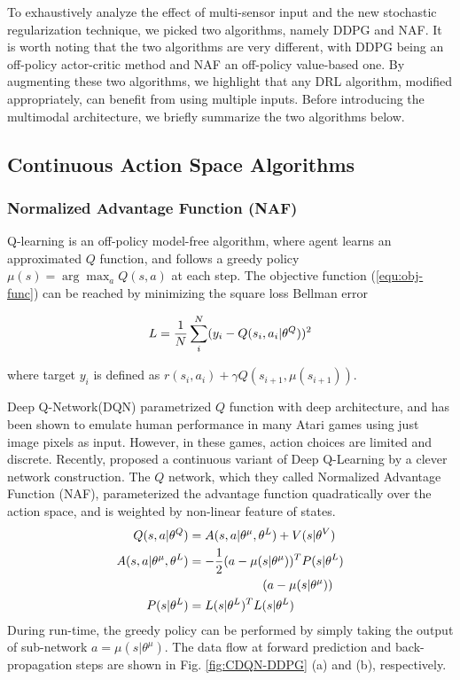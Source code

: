 \documentclass[../thesis.tex]{subfiles}
\begin{document}
To exhaustively analyze the effect of multi-sensor input and the new stochastic regularization technique, we picked two algorithms, namely DDPG and NAF. It is worth noting that the two algorithms are very different, with DDPG being an off-policy actor-critic method and NAF an off-policy value-based one. By augmenting these two algorithms, we highlight that any DRL algorithm, modified appropriately, can benefit from using multiple inputs. Before introducing the multimodal architecture, we briefly summarize the two algorithms below.
 
 
\subsection{Continuous Action Space Algorithms}
 
\subsubsection{Normalized Advantage Function (NAF)}
\label{sec:CDQN}
 
Q-learning \cite{sutton1999policy} is an off-policy model-free algorithm, where agent learns an approximated $Q$ function, and follows a greedy policy $\mu(s)=\arg\max_aQ(s,a)$ at each step. The objective function (\ref{equ:obj-func}) can be reached by minimizing the square loss Bellman error
 
\begin{align}
\centering
L = \frac{1}{N} \sum_i^N (y_i-Q(s_i,a_i|\theta^Q))^2
\end{align}
 
where target $y_i$ is defined as $r(s_i,a_i) + \gamma Q(s_{i+1},\mu(s_{i+1}))$.
 
 
Deep Q-Network(DQN) parametrized $Q$ function with deep architecture\cite{mnih2013playing}, and has been shown to emulate human performance \cite{mnih2015human} in many Atari games using just image pixels as input. However, in these games, action choices are limited and discrete. Recently, \citet{CDQN} proposed a continuous variant of Deep Q-Learning by a clever network construction. The $Q$ network, which they called Normalized Advantage Function (NAF), parameterized the advantage function quadratically over the action space, and is weighted by non-linear feature of states.
\begin{align}
\centering
Q(s,a|\theta^Q) &= A(s,a | \theta^\mu, \theta^L) + V(s|\theta^V) \\
A(s,a | \theta^\mu, \theta^L) &= -\frac{1}{2}(a-\mu(s|\theta^\mu))^T P(s|\theta^L)\nonumber \\
&\qquad \qquad \qquad(a-\mu(s|\theta^\mu)) \label{equ:NAF} \\
P(s|\theta^L) &= L(s|\theta^L)^TL(s|\theta^L) \label{equ:P}
\end{align}
During run-time, the greedy policy can be performed by simply taking the output of sub-network $a = \mu(s|\theta^\mu)$. The data flow at forward prediction and back-propagation steps are shown in Fig. \ref{fig:CDQN-DDPG} (a) and (b), respectively.
 
\end{document}
